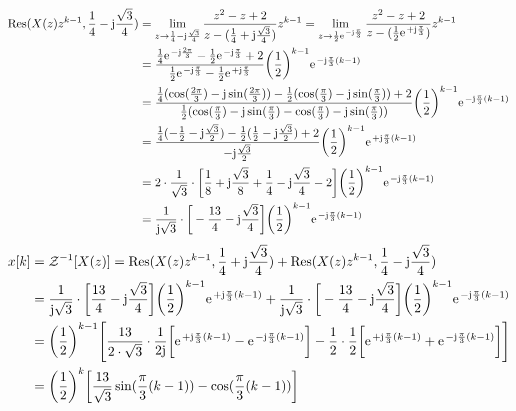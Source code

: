 \begin{align}
	\mathrm{Res}(X(z)z^{k-1},\frac{1}{4}-\im\frac{\sqrt{3}}{4})&=\lim\limits_{z\rightarrow\frac{1}{4}-\im\frac{\sqrt{3}}{4}}\frac{z^2-z+2}{z-(\frac{1}{4}+\im\frac{\sqrt{3}}{4})}z^{k-1}=\lim\limits_{z\rightarrow\frac{1}{2}\e^{-\im\frac{\pi}{3}}}\frac{z^2-z+2}{z-(\frac{1}{2}\e^{+\im\frac{\pi}{3}})}z^{k-1}\nonumber\\
	&=\frac{\frac{1}{4}\e^{-\im\frac{2\pi}{3}}-\frac{1}{2}\e^{-\im\frac{\pi}{3}}+2}{\frac{1}{2}\e^{-\im\frac{\pi}{3}}-\frac{1}{2}\e^{+\im\frac{\pi}{3}}}\bigg(\frac{1}{2}\bigg )^{k-1}\e^{-\im\frac{\pi}{3}(k-1)}\nonumber\\
	&=\frac{\frac{1}{4}(\cos(\frac{2\pi}{3})-\im\sin(\frac{2\pi}{3}))-\frac{1}{2}(\cos(\frac{\pi}{3})-\im\sin(\frac{\pi}{3}))+2}{\frac{1}{2}(\cos(\frac{\pi}{3})-\im\sin(\frac{\pi}{3})-\cos(\frac{\pi}{3})-\im\sin(\frac{\pi}{3}))}\bigg(\frac{1}{2}\bigg )^{k-1}\e^{-\im\frac{\pi}{3}(k-1)}\nonumber\\
	&=\frac{\frac{1}{4}(-\frac{1}{2}-\im\frac{\sqrt{3}}{2})-\frac{1}{2}(\frac{1}{2}-\im\frac{\sqrt{3}}{2})+2}{-\im\frac{\sqrt{3}}{2}}\bigg(\frac{1}{2}\bigg )^{k-1}\e^{+\im\frac{\pi}{3}(k-1)}\nonumber\\
	&=2\cdot\frac{1}{\sqrt{3}}\cdot\bigg [\frac{1}{8}+\im\frac{\sqrt{3}}{8}+\frac{1}{4}-\im\frac{\sqrt{3}}{4}-2\bigg]\bigg(\frac{1}{2}\bigg )^{k-1}\e^{-\im\frac{\pi}{3}(k-1)}\nonumber\\
	&=\frac{1}{\im\sqrt{3}}\cdot\bigg [-\frac{13}{4}-\im\frac{\sqrt{3}}{4}\bigg]\bigg(\frac{1}{2}\bigg)^{k-1}\e^{-\im\frac{\pi}{3}(k-1)}
\end{align}
\begin{align}
	x[k]&=\mathcal{Z}^{-1}[X(z)]=\mathrm{Res}(X(z)z^{k-1},\frac{1}{4}+\im\frac{\sqrt{3}}{4})+\mathrm{Res}(X(z)z^{k-1},\frac{1}{4}-\im\frac{\sqrt{3}}{4})\nonumber\\
	&=\frac{1}{\im\sqrt{3}}\cdot\bigg [\frac{13}{4}-\im\frac{\sqrt{3}}{4}\bigg]\bigg(\frac{1}{2}\bigg)^{k-1}\e^{+\im\frac{\pi}{3}(k-1)}+\frac{1}{\im\sqrt{3}}\cdot\bigg [-\frac{13}{4}-\im\frac{\sqrt{3}}{4}\bigg]\bigg(\frac{1}{2}\bigg)^{k-1}\e^{-\im\frac{\pi}{3}(k-1)}\nonumber\\
	&=\bigg (\frac{1}{2}\bigg)^{k-1}\Bigg[ \frac{13}{2\cdot\sqrt{3}}\cdot\frac{1}{2\im}\bigg [\e^{+\im\frac{\pi}{3}(k-1)}-\e^{-\im\frac{\pi}{3}(k-1)}\bigg]-\frac{1}{2}\cdot\frac{1}{2}\bigg [\e^{+\im\frac{\pi}{3}(k-1)}+\e^{-\im\frac{\pi}{3}(k-1)}\bigg]\Bigg ]\nonumber\\
	&=\bigg(\frac{1}{2}\bigg)^k\bigg[\frac{13}{\sqrt{3}}\sin(\frac{\pi}{3}(k-1))-\cos(\frac{\pi}{3}(k-1))\bigg]
\end{align}
